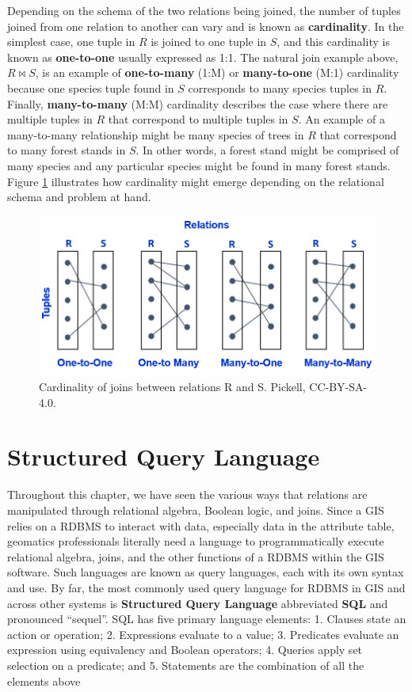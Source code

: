 \documentclass[
]{book}
\begin{document}
Depending on the schema of the two relations being joined, the number of tuples joined from one relation to another can vary and is known as \textbf{cardinality}. In the simplest case, one tuple in \(R\) is joined to one tuple in \(S\), and this cardinality is known as \textbf{one-to-one} usually expressed as 1:1. The natural join example above, \(R⋈S\), is an example of \textbf{one-to-many} (1:M) or \textbf{many-to-one} (M:1) cardinality because one species tuple found in \(S\) corresponds to many species tuples in \(R\). Finally, \textbf{many-to-many} (M:M) cardinality describes the case where there are multiple tuples in \(R\) that correspond to multiple tuples in \(S\). An example of a many-to-many relationship might be many species of trees in \(R\) that correspond to many forest stands in \(S\). In other words, a forest stand might be comprised of many species and any particular species might be found in many forest stands. Figure \ref{fig:5-join-cardinality} illustrates how cardinality might emerge depending on the relational schema and problem at hand.

\begin{figure}
\includegraphics[width=0.75\linewidth]{images/05-join-cardinality} \caption{Cardinality of joins between relations R and S. Pickell, CC-BY-SA-4.0.}\label{fig:5-join-cardinality}
\end{figure}

\hypertarget{structured-query-language}{%
\section{Structured Query Language}\label{structured-query-language}}

Throughout this chapter, we have seen the various ways that relations are manipulated through relational algebra, Boolean logic, and joins. Since a GIS relies on a RDBMS to interact with data, especially data in the attribute table, geomatics professionals literally need a language to programmatically execute relational algebra, joins, and the other functions of a RDBMS within the GIS software. Such languages are known as query languages, each with its own syntax and use. By far, the most commonly used query language for RDBMS in GIS and across other systems is \textbf{Structured Query Language} abbreviated \textbf{SQL} and pronounced ``sequel''. SQL has five primary language elements:
1. Clauses state an action or operation;
2. Expressions evaluate to a value;
3. Predicates evaluate an expression using equivalency and Boolean operators;
4. Queries apply set selection on a predicate; and
5. Statements are the combination of all the elements above
\end{document}
